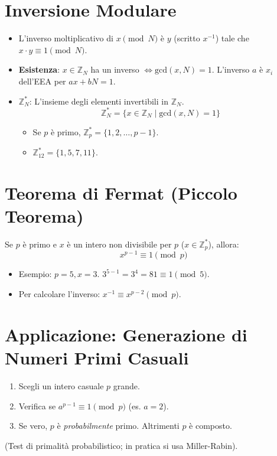 \section{Inversione Modulare}
\begin{itemize}
    \item L'inverso moltiplicativo di $x \pmod N$ è $y$ (scritto $x^{-1}$) tale che $x \cdot y \equiv 1 \pmod N$.
    \item \textbf{Esistenza}: $x \in \mathbb{Z}_N$ ha un inverso $\iff \text{gcd}(x, N) = 1$.
    L'inverso $a$ è $x_i$ dell'EEA per $ax+bN=1$.
    \item \textbf{$\mathbb{Z}_N^*$}: L'insieme degli elementi invertibili in $\mathbb{Z}_N$.
    \[ \mathbb{Z}_N^* = \{x \in \mathbb{Z}_N \mid \text{gcd}(x,N) = 1 \} \]
    \begin{itemize}
        \item Se $p$ è primo, $\mathbb{Z}_p^* = \{1, 2, \dots, p-1\}$.
        \item $\mathbb{Z}_{12}^* = \{1, 5, 7, 11\}$.
    \end{itemize}
\end{itemize}

\section{Teorema di Fermat (Piccolo Teorema)}
Se $p$ è primo e $x$ è un intero non divisibile per $p$ ($x \in \mathbb{Z}_p^*$), allora:
\[ x^{p-1} \equiv 1 \pmod p \]
\begin{itemize}
    \item Esempio: $p=5, x=3$. $3^{5-1} = 3^4 = 81 \equiv 1 \pmod 5$.
    \item Per calcolare l'inverso: $x^{-1} \equiv x^{p-2} \pmod p$.
\end{itemize}

\section{Applicazione: Generazione di Numeri Primi Casuali}
\begin{enumerate}
    \item Scegli un intero casuale $p$ grande.
    \item Verifica se $a^{p-1} \equiv 1 \pmod p$ (es. $a=2$).
    \item Se vero, $p$ è \textit{probabilmente} primo. Altrimenti $p$ è composto.
\end{enumerate}
(Test di primalità probabilistico; in pratica si usa Miller-Rabin).

